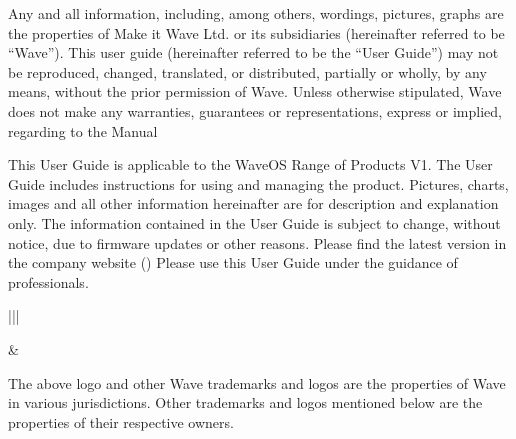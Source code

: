 \documentclass[letterpaper,10pt,openany,oneside,english]{sphinxmanual}
\begin{document}
Any and all information, including, among others, wordings, pictures, graphs are the properties of Make it Wave Ltd. or its subsidiaries (hereinafter referred to be “Wave”). This user guide (hereinafter referred to be the “User Guide”) may not be reproduced, changed, translated, or distributed, partially or wholly, by any means, without the prior permission of Wave. Unless otherwise stipulated, Wave does not make any warranties, guarantees or representations, express or implied, regarding to the Manual


This User Guide is applicable to the WaveOS Range of Products V1.
The User Guide includes instructions for using and managing the product. Pictures, charts, images and all other information hereinafter are for description and explanation only. The information contained in the User Guide is subject to change, without notice, due to firmware updates or other reasons. Please find the latest version in the company website ()
Please use this User Guide under the guidance of professionals.



\begin{savenotes}\sphinxattablestart
\centering
\begin{tabular}[t]{|||}
\hline

\noindent{}
&
\\
\hline
\end{tabular}
\par
\sphinxattableend\end{savenotes}

The above logo and other Wave trademarks and logos are the properties of Wave in various jurisdictions. Other trademarks and logos mentioned below are the properties of their respective owners.

\end{document}
